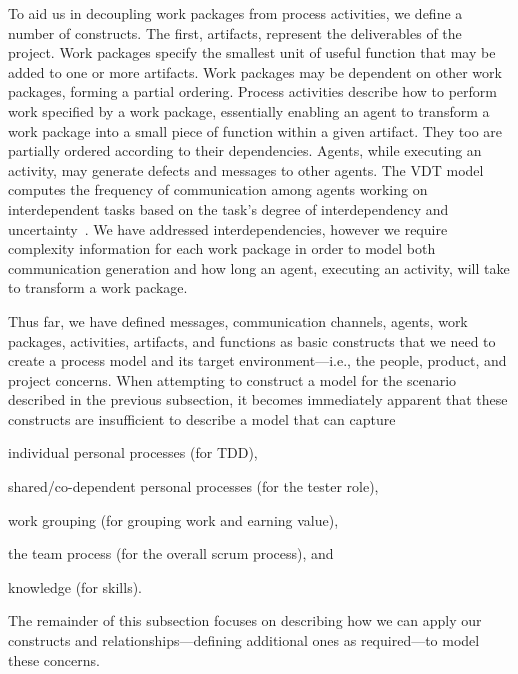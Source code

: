 To aid us in decoupling work packages from process activities, we define
a number of constructs.
The first, artifacts, represent the deliverables of the project.  Work packages
specify the smallest unit of useful function that may be added to one or more
artifacts.  Work packages may be dependent on other work packages, forming a
partial ordering.  Process activities describe how to perform work specified by
a work package, essentially enabling an agent to transform a work package into a
small piece of function within a given artifact.  They too are partially ordered
according to their dependencies.
Agents, while executing an activity, may generate defects and messages to other
agents.  The VDT model computes the frequency of communication among agents
working on interdependent tasks based on the task's degree of interdependency
and uncertainty~\cite[p.178]{jin_virtual_1996}.
We have addressed interdependencies, however we require complexity information
for each work package in order to model both communication generation and how
long an agent, executing an activity, will take to transform a work package.

Thus far, we have defined messages, communication channels, agents, work
packages, activities, artifacts, and functions as basic constructs that we need
to create a process model and its target environment---i.e., the people,
product, and project concerns.  When attempting to construct a model for the
scenario described in the previous subsection, it becomes immediately apparent
that these constructs are insufficient to describe a model that can capture
\begin{inparaenum}[]
  \item individual personal processes (for TDD), 
  \item shared/co-dependent personal processes (for the tester role), 
  \item work grouping (for grouping work and earning value), 
  \item the team process (for the overall scrum process), and 
  \item knowledge (for skills).
\end{inparaenum}
The remainder of this subsection focuses on describing how we can apply our
constructs and relationships---defining additional ones as required---to model
these concerns.


